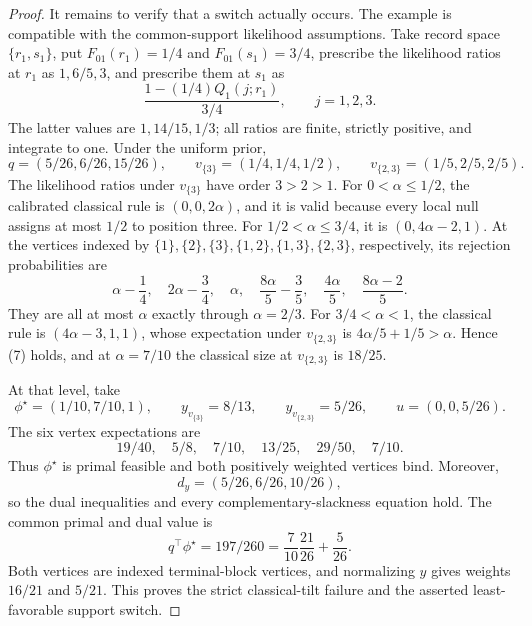 \documentclass{article}
\begin{document}
\begin{proof}
It remains to verify that a switch actually occurs. The example is compatible with the common-support likelihood assumptions. Take record space \(\{r_1,s_1\}\), put \(F_{01}(r_1)=1/4\) and \(F_{01}(s_1)=3/4\), prescribe the likelihood ratios at \(r_1\) as \(1,6/5,3\), and prescribe them at \(s_1\) as
\[
 \frac{1-(1/4)Q_1(j;r_1)}{3/4},\qquad j=1,2,3.
\]
The latter values are \(1,14/15,1/3\); all ratios are finite, strictly positive, and integrate to one. Under the uniform prior,
\[
 q=(5/26,6/26,15/26),\qquad v_{\{3\}}=(1/4,1/4,1/2),\qquad v_{\{2,3\}}=(1/5,2/5,2/5).\tag{14}
\]
The likelihood ratios under \(v_{\{3\}}\) have order \(3>2>1\). For \(0<\alpha\leq1/2\), the calibrated classical rule is \((0,0,2\alpha)\), and it is valid because every local null assigns at most \(1/2\) to position three. For \(1/2<\alpha\leq3/4\), it is \((0,4\alpha-2,1)\). At the vertices indexed by \(\{1\},\{2\},\{3\},\{1,2\},\{1,3\},\{2,3\}\), respectively, its rejection probabilities are
\[
 \alpha-\frac14,\quad2\alpha-\frac34,\quad\alpha,\quad\frac{8\alpha}{5}-\frac35,\quad\frac{4\alpha}{5},\quad\frac{8\alpha-2}{5}.\tag{15}
\]
They are all at most \(\alpha\) exactly through \(\alpha=2/3\). For \(3/4<\alpha<1\), the classical rule is \((4\alpha-3,1,1)\), whose expectation under \(v_{\{2,3\}}\) is \(4\alpha/5+1/5>\alpha\). Hence (7) holds, and at \(\alpha=7/10\) the classical size at \(v_{\{2,3\}}\) is \(18/25\).

At that level, take
\[
 \phi^\star=(1/10,7/10,1),\qquad y_{v_{\{3\}}}=8/13,\qquad y_{v_{\{2,3\}}}=5/26,\qquad u=(0,0,5/26).\tag{16}
\]
The six vertex expectations are
\[
 19/40,\quad5/8,\quad7/10,\quad13/25,\quad29/50,\quad7/10.\tag{17}
\]
Thus \(\phi^\star\) is primal feasible and both positively weighted vertices bind. Moreover,
\[
 d_y=(5/26,6/26,10/26),
\]
so the dual inequalities and every complementary-slackness equation hold. The common primal and dual value is
\[
 q^\top\phi^\star=197/260=\frac{7}{10}\frac{21}{26}+\frac{5}{26}.\tag{18}
\]
Both vertices are indexed terminal-block vertices, and normalizing \(y\) gives weights \(16/21\) and \(5/21\). This proves the strict classical-tilt failure and the asserted least-favorable support switch.
\end{proof}
\end{document}
